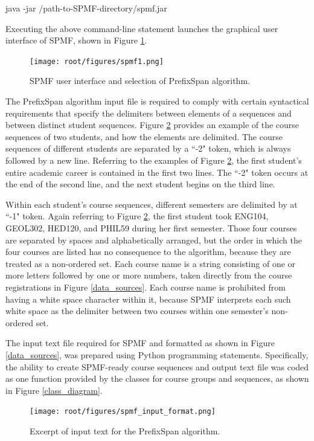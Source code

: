 java -jar /path-to-SPMF-directory/spmf.jar

Executing the above command-line statement launches the graphical user interface of SPMF, shown in Figure \ref{spmf_interface}.    

\begin{figure}[htbp]
\centering
\texttt{[image: root/figures/spmf1.png]}
\caption{SPMF user interface and selection of PrefixSpan algorithm.}
\label{spmf_interface}
\end{figure}

The PrefixSpan algorithm input file is required to comply with certain syntactical requirements that specify the delimiters between elements of a sequences and between distinct student sequences.  Figure \ref{spmf_input_format} provides an example of the course sequences of two students, and how the elements are delimited.  The course sequences of different students are separated by a ``-2" token, which is always followed by a new line.  Referring to the examples of Figure \ref{spmf_input_format}, the first student's entire academic career is contained in the first two lines.  The ``-2" token occurs at the end of the second line, and the next student begins on the third line. 


Within each student's course sequences, different semesters are delimited by at ``-1" token.  Again referring to Figure \ref{spmf_input_format}, the first student took ENG104, GEOL302, HED120, and PHIL59 during her first semester.  Those four courses are separated by spaces and alphabetically arranged, but the order in which the four courses are listed has no consequence to the algorithm, because they are treated as a non-ordered set.  Each course name is a string consisting of one or more letters followed by one or more numbers, taken directly from the course registrations in Figure \ref{data_sources}.  Each course name is prohibited from having a white space character within it, because SPMF interprets each such white space as the delimiter between two courses within one semester's non-ordered set.   

The input text file required for SPMF and formatted as shown in Figure \ref{data_sources}, was prepared using Python programming statements.  Specifically, the ability to create SPMF-ready course sequences and output text file was coded as one function provided by the classes for course groups and sequences, as shown in Figure \ref{class_diagram}.  

\begin{figure}[htbp]
\centering
\texttt{[image: root/figures/spmf\_input\_format.png]}
\caption{Excerpt of input text for the PrefixSpan algorithm.}
\label{spmf_input_format}
\end{figure}

